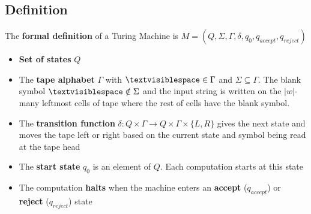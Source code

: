 \documentclass{article}
\begin{document}
\subsection{Definition}
The \textbf{formal definition} of a Turing Machine is $M=(Q,\Sigma,\Gamma,\delta,q_0,q_{accept},q_{reject})$
\begin{itemize}
    \item \textbf{Set of states} $Q$
    \item The \textbf{tape alphabet} $\Gamma$ with $\textvisiblespace\in\Gamma$ and $\Sigma\subseteq\Gamma$. The blank symbol $\textvisiblespace\notin\Sigma$ and the input string is written on the $|w|$-many leftmost cells of tape where the rest of cells have the blank symbol.
    \item The \textbf{transition function} $\delta:Q\times\Gamma\rightarrow Q\times\Gamma\times\{L,R\}$ gives the next state and moves the tape left or right based on the current state and symbol being read at the tape head
    \item The \textbf{start state} $q_0$ is an element of $Q$. Each computation starts at this state
    \item The computation \textbf{halts} when the machine enters an \textbf{accept} ($q_{accept}$) or \textbf{reject} ($q_{reject}$) state
\end{itemize}
\end{document}
